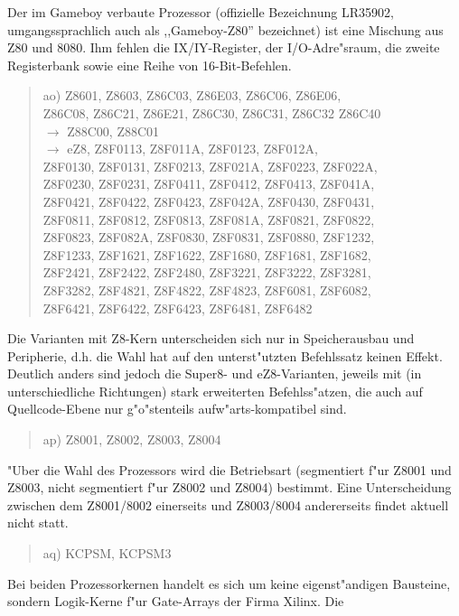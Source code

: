 \documentclass[12pt,a4paper,twoside]{report}
\begin{document}
Der im Gameboy verbaute Prozessor (offizielle Bezeichnung LR35902,
umgangssprachlich auch als ,,Gameboy-Z80'' bezeichnet) ist eine
Mischung aus Z80 und 8080.  Ihm fehlen die IX/IY-Register, der
I/O-Adre"sraum, die zweite Registerbank sowie eine Reihe von
16-Bit-Befehlen.
\begin{quote}
ao) Z8601, Z8603, Z86C03, Z86E03, Z86C06, Z86E06, \\
    Z86C08, Z86C21, Z86E21, Z86C30, Z86C31, Z86C32 Z86C40 \\
    $\rightarrow$ Z88C00, Z88C01 \\
    $\rightarrow$ eZ8, Z8F0113, Z8F011A, Z8F0123, Z8F012A, \\
    Z8F0130, Z8F0131, Z8F0213, Z8F021A, Z8F0223, Z8F022A, \\
    Z8F0230, Z8F0231, Z8F0411, Z8F0412, Z8F0413, Z8F041A, \\
    Z8F0421, Z8F0422, Z8F0423, Z8F042A, Z8F0430, Z8F0431, \\
    Z8F0811, Z8F0812, Z8F0813, Z8F081A, Z8F0821, Z8F0822, \\
    Z8F0823, Z8F082A, Z8F0830, Z8F0831, Z8F0880, Z8F1232, \\
    Z8F1233, Z8F1621, Z8F1622, Z8F1680, Z8F1681, Z8F1682, \\
    Z8F2421, Z8F2422, Z8F2480, Z8F3221, Z8F3222, Z8F3281, \\
    Z8F3282, Z8F4821, Z8F4822, Z8F4823, Z8F6081, Z8F6082, \\
    Z8F6421, Z8F6422, Z8F6423, Z8F6481, Z8F6482
\end{quote}
Die Varianten mit Z8-Kern unterscheiden sich nur in
Speicherausbau und Peripherie, d.h. die Wahl hat auf den
unterst"utzten Befehlssatz keinen Effekt.  Deutlich anders sind
jedoch die Super8- und eZ8-Varianten, jeweils mit (in unterschiedliche
Richtungen) stark erweiterten Befehlss"atzen, die auch auf Quellcode-Ebene
nur g"o"stenteils aufw"arts-kompatibel sind.
\begin{quote}
ap) Z8001, Z8002, Z8003, Z8004
\end{quote}
"Uber die Wahl des Prozessors wird die Betriebsart (segmentiert f"ur
Z8001 und Z8003, nicht segmentiert f"ur Z8002 und Z8004) bestimmt.  Eine
Unterscheidung zwischen dem Z8001/8002 einerseits und Z8003/8004 andererseits
findet aktuell nicht statt.
\begin{quote}
aq) KCPSM, KCPSM3
\end{quote}
Bei beiden Prozessorkernen handelt es sich um keine eigenst"andigen
Bausteine, sondern Logik-Kerne f"ur Gate-Arrays der Firma Xilinx.  Die
\end{document}
